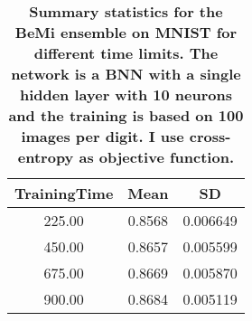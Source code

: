 \begin{center}
\begin{table}[H]
\centering
\begin{tabular}{|c|c|c|}
  \hline
TrainingTime & Mean & SD \\ 
  \hline
225.00 & 0.8568 & 0.006649 \\ 
   \hline
450.00 & 0.8657 & 0.005599 \\ 
   \hline
675.00 & 0.8669 & 0.005870 \\ 
   \hline
900.00 & 0.8684 & 0.005119 \\ 
   \hline
\end{tabular}
\caption{\small{\textbf{Summary statistics for the BeMi ensemble on MNIST for different time limits. The
          network is a BNN with a single hidden layer with 10 neurons and the training is based on
          100 images per digit. I use cross-entropy as objective function.}}} 
\label{BEMI_TIME}
\end{table}

\end{center}
